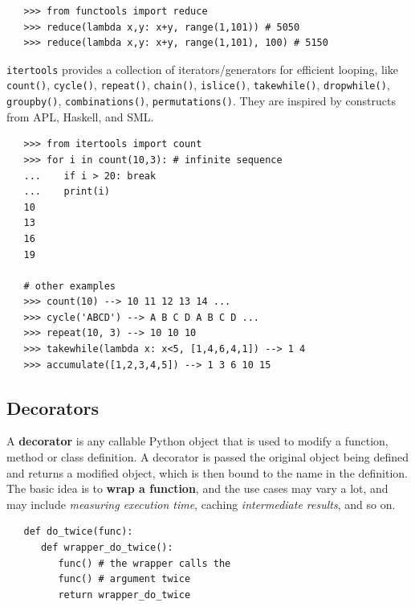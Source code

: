 \begin{lstlisting}
   >>> from functools import reduce
   >>> reduce(lambda x,y: x+y, range(1,101)) # 5050
   >>> reduce(lambda x,y: x+y, range(1,101), 100) # 5150
\end{lstlisting}

\texttt{itertools} provides a collection of iterators/generators for efficient looping, like \texttt{count()}, \texttt{cycle()}, \texttt{repeat()}, \texttt{chain()}, \texttt{islice()}, \texttt{takewhile()}, \texttt{dropwhile()}, \texttt{groupby()}, \texttt{combinations()}, \texttt{permutations()}.
They are inspired by constructs from APL, Haskell, and SML.

\begin{lstlisting}
   >>> from itertools import count
   >>> for i in count(10,3): # infinite sequence
   ...    if i > 20: break
   ...    print(i)
   10
   13
   16
   19
   
   # other examples
   >>> count(10) --> 10 11 12 13 14 ...
   >>> cycle('ABCD') --> A B C D A B C D ...
   >>> repeat(10, 3) --> 10 10 10
   >>> takewhile(lambda x: x<5, [1,4,6,4,1]) --> 1 4
   >>> accumulate([1,2,3,4,5]) --> 1 3 6 10 15
\end{lstlisting}

\subsection{Decorators}
A \textbf{decorator} is any callable Python object that is used
to modify a function, method or class definition.
A decorator is passed the original object being defined
and returns a modified object, which is then bound to the name in the definition.
The basic idea is to \textbf{wrap a function},
and the use cases may vary a lot, 
and may include \textit{measuring execution time}, caching \textit{intermediate results}, and so on.

\begin{lstlisting}
   def do_twice(func):
      def wrapper_do_twice():
         func() # the wrapper calls the
         func() # argument twice
         return wrapper_do_twice
\end{lstlisting}


